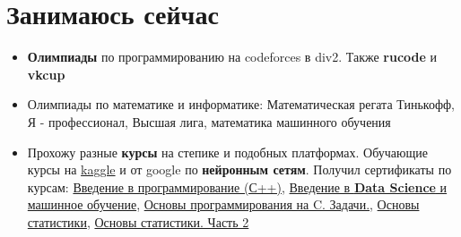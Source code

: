 \documentclass[a4paper,10pt]{report}
\begin{document}
\section{Занимаюсь сейчас}
\begin{itemize}
    \item \textbf{Олимпиады} по программированию на codeforces в div2. Также \textbf{rucode} и \textbf{vkcup}
    \item Олимпиады по математике и информатике: Математическая регата Тинькофф, Я - профессионал, Высшая лига, математика машинного обучения

    \item Прохожу разные \textbf{курсы} на степике и подобных платформах. Обучающие курсы на \underline{kaggle} и от google по \textbf{нейронным сетям}. Получил сертификаты по курсам:        \href{https://stepik.org/course/363/syllabus}{Введение в программирование (С++)}, \href{https://stepik.org/course/4852/syllabus}{Введение в \textbf{Data Science} и машинное обучение},          \href{https://stepik.org/course/3078/syllabus}{Основы программирования на C. Задачи.}, \href{https://stepik.org/course/76/syllabus}{Основы статистики}, \href{https://stepik.org/course/524/syllabus}{Основы статистики. Часть 2}    
\end{itemize}
\end{document}
